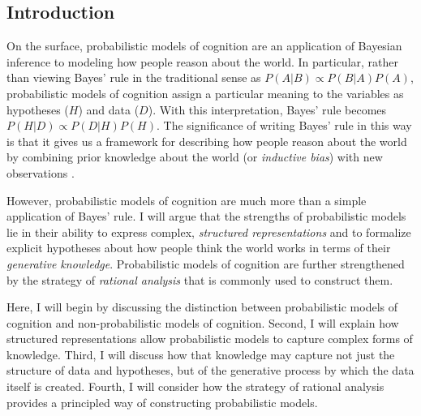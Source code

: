 \documentclass[12pt]{article}
\begin{document}


\subsection*{Introduction}

On the surface, probabilistic models of cognition are an application of Bayesian inference to modeling how people reason about the world. In particular, rather than viewing Bayes' rule in the traditional sense as $P(A|B)\propto P(B|A)P(A)$, probabilistic models of cognition assign a particular meaning to the variables as hypotheses ($H$) and data ($D$). With this interpretation, Bayes' rule becomes $P(H|D)\propto P(D|H)P(H)$. The significance of writing Bayes' rule in this way is that it gives us a framework for describing how people reason about the world by combining prior knowledge about the world (or \textit{inductive bias}) with new observations \citep{Griffiths2010}.

However, probabilistic models of cognition are much more than a simple application of Bayes' rule. I will argue that the strengths of probabilistic models lie in their ability to express complex, \textit{structured representations} and to formalize explicit hypotheses about how people think the world works in terms of their \textit{generative knowledge}. Probabilistic models of cognition are further strengthened by the strategy of \textit{rational analysis} that is commonly used to construct them.

Here, I will begin by discussing the distinction between probabilistic models of cognition and non-probabilistic models of cognition. Second, I will explain how structured representations allow probabilistic models to capture complex forms of knowledge. Third, I will discuss how that knowledge may capture not just the structure of data and hypotheses, but of the generative process by which the data itself is created. Fourth, I will consider how the strategy of rational analysis provides a principled way of constructing probabilistic models.
\end{document}
